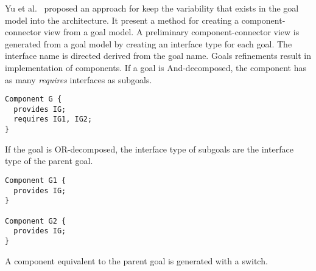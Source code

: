 Yu et al.~\cite{yu_goals_2008} proposed an approach for keep the variability that exists in the goal model into the architecture.
It present a method for creating a component-connector view from a goal model.
A preliminary component-connector view is generated from a goal model by creating an interface type for each goal. The interface name is directed derived from the goal name. Goals refinements result in implementation of components.
If a goal is And-decomposed, the component has as many \emph{requires} interfaces as subgoals.

\begin{lstlisting}
Component G {
  provides IG;
  requires IG1, IG2;
}
\end{lstlisting}

If the goal is OR-decomposed, the interface type of subgoals are the interface type of the parent goal.

\begin{lstlisting}
Component G1 {
  provides IG;
}

Component G2 {
  provides IG;
}
\end{lstlisting}

A component equivalent to the parent goal is generated with a switch.



